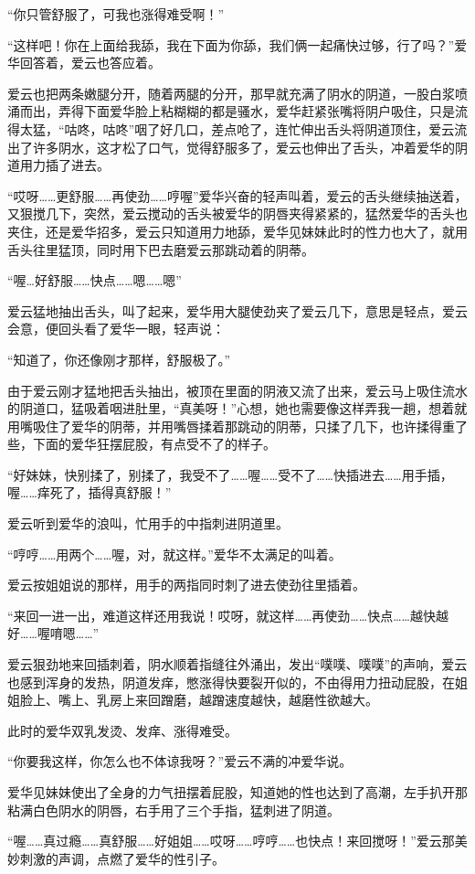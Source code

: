 \documentclass[12pt,UTF8]{ctexbook}
\begin{document}
“你只管舒服了，可我也涨得难受啊！”

“这样吧！你在上面给我舔，我在下面为你舔，我们俩一起痛快过够，行了吗？”爱华回答着，爱云也答应着。

爱云也把两条嫩腿分开，随着两腿的分开，那早就充满了阴水的阴道，一股白浆喷涌而出，弄得下面爱华脸上粘糊糊的都是骚水，爱华赶紧张嘴将阴户吸住，只是流得太猛，“咕咚，咕咚”咽了好几口，差点呛了，连忙伸出舌头将阴道顶住，爱云流出了许多阴水，这才松了口气，觉得舒服多了，爱云也伸出了舌头，冲着爱华的阴道用力插了进去。

“哎呀……更舒服……再使劲……哼喔”爱华兴奋的轻声叫着，爱云的舌头继续抽送着，又狠搅几下，突然，爱云搅动的舌头被爱华的阴唇夹得紧紧的，猛然爱华的舌头也夹住，还是爱华招多，爱云只知道用力地舔，爱华见妹妹此时的性力也大了，就用舌头往里猛顶，同时用下巴去磨爱云那跳动着的阴蒂。

“喔…好舒服……快点……嗯……嗯”

爱云猛地抽出舌头，叫了起来，爱华用大腿使劲夹了爱云几下，意思是轻点，爱云会意，便回头看了爱华一眼，轻声说：

“知道了，你还像刚才那样，舒服极了。”

由于爱云刚才猛地把舌头抽出，被顶在里面的阴液又流了出来，爱云马上吸住流水的阴道口，猛吸着咽进肚里，“真美呀！”心想，她也需要像这样弄我一趟，想着就用嘴吸住了爱华的阴蒂，并用嘴唇揉着那跳动的阴蒂，只揉了几下，也许揉得重了些，下面的爱华狂摆屁股，有点受不了的样子。

“好妹妹，快别揉了，别揉了，我受不了……喔……受不了……快插进去……用手插，喔……痒死了，插得真舒服！”

爱云听到爱华的浪叫，忙用手的中指刺进阴道里。

“哼哼……用两个……喔，对，就这样。”爱华不太满足的叫着。

爱云按姐姐说的那样，用手的两指同时刺了进去使劲往里插着。

“来回一进一出，难道这样还用我说！哎呀，就这样……再使劲……快点……越快越好……喔唷嗯……”

爱云狠劲地来回插刺着，阴水顺着指缝往外涌出，发出“噗噗、噗噗”的声响，爱云也感到浑身的发热，阴道发痒，憋涨得快要裂开似的，不由得用力扭动屁股，在姐姐脸上、嘴上、乳房上来回蹭磨，越蹭速度越快，越磨性欲越大。

此时的爱华双乳发烫、发痒、涨得难受。

“你要我这样，你怎么也不体谅我呀？”爱云不满的冲爱华说。

爱华见妹妹使出了全身的力气扭摆着屁股，知道她的性也达到了高潮，左手扒开那粘满白色阴水的阴唇，右手用了三个手指，猛刺进了阴道。

“喔……真过瘾……真舒服……好姐姐……哎呀……哼哼……也快点！来回搅呀！”爱云那美妙刺激的声调，点燃了爱华的性引子。
\end{document}
